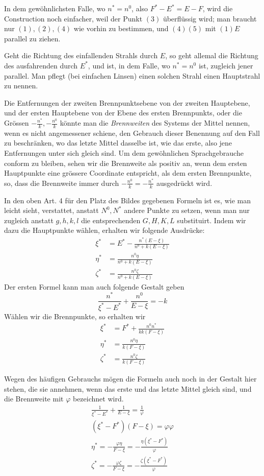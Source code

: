 In dem gewöhnlichsten Falle, wo $n^*=n^0$, also $F^*-E^*=E-F$, wird die Construction noch einfacher, weil der Punkt $(3)$ überflüssig wird; man braucht nur $(1),(2),(4)$ wie vorhin zu bestimmen, und $(4)(5)$ mit $(1)E$ parallel zu ziehen.

Geht die Richtung des einfallenden Strahls durch $E$, so geht allemal die Richtung des ausfahrenden durch $E^*$, und ist, in dem Falle, wo $n^*=n^0$ ist, zugleich jener parallel. Man pflegt (bei einfachen Linsen) einen solchen Strahl einen Hauptstrahl zu nennen.

Die Entfernungen der zweiten Brennpunktsebene von der zweiten Haupt\-ebene, und der ersten Hauptebene von der Ebene des ersten Brennpunkts, oder die Grössen $-\frac{n^*}k,-\frac{n^0}k$ könnte man die \textit{Brennweiten} des Systems der Mittel nennen, wenn es nicht angemessener schiene, den Gebrauch dieser Benennung auf den Fall zu beschränken, wo das letzte Mittel dasselbe ist, wie das erste, also jene Entfernungen unter sich gleich sind. Um dem gewöhnlichen Sprachgebrauche conform zu bleiben, sehen wir die Brennweite als positiv an, wenn dem ersten Hauptpunkte eine grössere Coordinate entspricht, als dem ersten Brennpunkte, so, dass die Brennweite immer durch $-\frac{n^0}k=-\frac{n^*}k$ ausgedrückt wird.

In den oben Art. 4 für den Platz des Bildes gegebenen Formeln ist es, wie man leicht sieht, verstattet, anstatt $N^0,N^*$ andere Punkte zu setzen, wenn man nur zugleich anstatt $g,h,k,l$ die entsprechenden $G,H,K,L$ substituirt. Indem wir dazu die Hauptpunkte wählen, erhalten wir folgende Ausdrücke:
\[
\begin{aligned}
\xi^*&=E^*-\frac{n^*(E-\xi)}{n^0+k(E-\xi)}\\
\eta^*&=\frac{n^0\eta}{n^0+k(E-\xi)}\\
\zeta^*&=\frac{n^0\zeta}{n^0+k(E-\xi)}
\end{aligned}
\]
Der ersten Formel kann man auch folgende Gestalt geben
\[
\frac{n^*}{\xi^*-E^*}+\frac{n^0}{E-\xi}=-k
\]
Wählen wir die Brennpunkte, so erhalten wir
\[
\begin{aligned}
\xi^*&=F^*+\frac{n^0n^*}{kk(F-\xi)}\\
\eta^*&=\frac{n^0\eta}{k(F-\xi)}\\
\zeta^*&=\frac{n^0\zeta}{k(F-\xi)}
\end{aligned}
\]

Wegen des häufigen Gebrauchs mögen die Formeln auch noch in der Gestalt hier stehen, die sie annehmen, wenn das erste und das letzte Mittel gleich sind, und die Brennweite mit $\varphi$ bezeichnet wird.
\[
\begin{gathered}
\frac1{\xi^*-E^*}+\frac1{E-\xi}=\frac1\varphi\\
(\xi^*-F^*)(F-\xi)=\varphi\varphi\\
\eta^*=-\frac{\varphi\eta}{F-\xi}=-\frac{\eta(\xi^*-F^*)}{\varphi}\\
\zeta^*=-\frac{\varphi\zeta}{F-\xi}=-\frac{\zeta(\xi^*-F^*)}{\varphi}
\end{gathered}
\]

